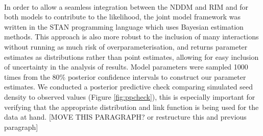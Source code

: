 \documentclass[a4,12pt]{article}
\begin{document}
    \paragraph{}
        In order to allow a seamless integration between the NDDM and RIM and for both models to contribute to the likelihood, the joint model framework was written in the STAN programming language which uses Bayesian estimation methods. This approach is also more robust to the inclusion of many interactions without running as much risk of overparameterisation, and returns parameter estimates as distributions rather than point estimates, allowing for easy inclusion of uncertainty in the analysis of results. Model parameters were sampled 1000 times from the 80\% posterior confidence intervals to construct our parameter estimates. We conducted a posterior predictive check comparing simulated seed density to observed values (Figure \ref{fig:ppcheck}), this is especially important for verifying that the appropriate distribution and link function is being used for the data at hand. [MOVE THIS PARAGRAPH? or restructure this and previous paragraph]
\end{document}
